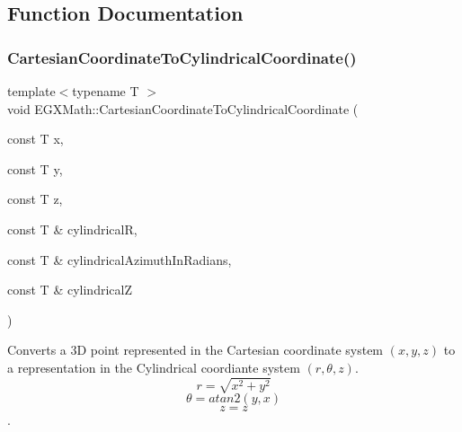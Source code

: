 \subsection{Function Documentation}
\mbox{\label{group___e_g_x_math-_conversions-_coordinate_conversions-3_d-_cartesian_ga256f37d22da9bb58db556ee40dac8d81}} 
\subsubsection{\texorpdfstring{Cartesian\+Coordinate\+To\+Cylindrical\+Coordinate()}{CartesianCoordinateToCylindricalCoordinate()}}
{\footnotesize\ttfamily template$<$typename T $>$ \\
void E\+G\+X\+Math\+::\+Cartesian\+Coordinate\+To\+Cylindrical\+Coordinate (\begin{DoxyParamCaption}\item[{const T}]{x,  }\item[{const T}]{y,  }\item[{const T}]{z,  }\item[{const T \&}]{cylindricalR,  }\item[{const T \&}]{cylindrical\+Azimuth\+In\+Radians,  }\item[{const T \&}]{cylindricalZ }\end{DoxyParamCaption})}



Converts a 3D point represented in the Cartesian coordinate system $(x,y,z)$ to a representation in the Cylindrical coordiante system $(r,\theta,z)$. \[ r = \sqrt{x^2+y^2} \] \[ \theta = atan2(y,x) \] \[ z = z \]. 


